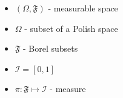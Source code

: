 	\begin{itemize}
		\item[] $(\Omega, \mathfrak{F})$ - measurable space
		\item[] $\Omega$ - subset of a Polish space
		\item[] $\mathfrak{F}$ - Borel subsets
		\item[] $\mathcal{I} = [0,1]$ 
		\item[] $ \pi: \mathfrak{F} \mapsto \mathcal{I}$ - measure
	\end{itemize}	
